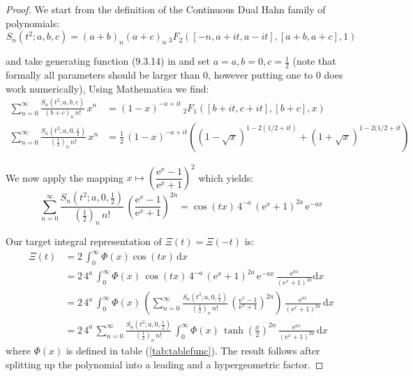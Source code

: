 \documentclass[a4paper,11pt,twoside]{amsart}
\newcommand{\verifiedeq}{=}
\newcommand{\defeq}{=}
\newcommand{\verifiedeq}{\stackrel{\checkmark}{=}}
\newcommand{\defeq}{\stackrel{\scriptscriptstyle \textnormal{def}}{=}}
\begin{document}
\begin{proof}
We start from the definition of the Continuous Dual Hahn family of polynomials:
\begin{equation}
 S_n(t^2;a,b,c) \defeq (a+b)_n(a+c)_n\, {}_3F_2([-n,a+it, a- it], [a+b, a+c], 1) 
\end{equation}

and take generating function (9.3.14) in \cite{koe} and set $a=a,b=0,c=\frac12$ (note that formally all parameters should be larger than $0$, however putting one to $0$ does work numerically), Using Mathematica we find:
\begin{align}
 \sum_{n=0}^\infty \frac{S_n(t^2;a,b,c)}{(b+c)_n\,n!}\, x^n &\verifiedeq (1-x)^{-a+it}\,{}_2F_1\left([b+it, c+it],[b+c], x\right) \\
\sum_{n=0}^\infty \frac{S_n\left(t^2;a,0,\frac12\right)}{\left(\frac12\right)_n\,n!}\,x^n&\verifiedeq \frac12\,(1-x)^{-a+it}\left((1-\sqrt{x})^{1-2(1/2+it)}+(1+\sqrt{x})^{1-2(1/2+it}\right)
\end{align}

We now apply the mapping $x \mapsto \left(\dfrac{\textrm{e}^{x}-1}{\textrm{e}^{x}+1}\right)^2$ which yields:
\begin{equation}
 \sum_{n=0}^\infty \frac{S_n\left(t^2;a,0,\frac12\right)}{\left(\frac12\right)_n\,n!}\, \left(\frac{\textrm{e}^{x}-1}{\textrm{e}^{x}+1}\right)^{2n} \verifiedeq \cos(tx)\,4^{-a}\,(\mathrm{e}^x+1)^{2a}\,\mathrm{e}^{-ax}
\end{equation}

Our target integral representation of $\Xi(t) = \Xi(-t)$ is:
\begin{align}
 \Xi(t) &\verifiedeq 2\,\int_{0}^\infty \Phi(x)\cos(tx)\, \mathrm{d}x \\
 &\verifiedeq 2\,4^a\,\int_{0}^\infty \Phi(x)\,\cos(tx)\,4^{-a}\,(\mathrm{e}^x+1)^{2a}\,\mathrm{e}^{-ax} \,\frac{\mathrm{e}^{ax}}{(\mathrm{e}^x+1)^{2a}} \mathrm{d}x \\
 &\verifiedeq 2\,4^a\,\int_{0}^\infty \Phi(x)\,\left(\sum_{n=0}^\infty \frac{S_n\left(t^2;a,0,\frac12\right)}{\left(\frac12\right)_n\,n!}\, \left(\frac{\textrm{e}^{x}-1}{\textrm{e}^{x}+1}\right)^{2n}\right)\,\frac{\mathrm{e}^{ax}}{(\mathrm{e}^x+1)^{2a}}\, \mathrm{d}x \\
 &\verifiedeq 2\,4^a\,\sum_{n=0}^\infty \frac{S_n\left(t^2;a,0,\frac12\right)}{\left(\frac12\right)_n\,n!}\,\int_{0}^{\infty} \Phi(x)\,\tanh\left(\frac{x}{2}\right)^{2n}\,\frac{\mathrm{e}^{ax}}{(\mathrm{e}^x+1)^{2a}}\,\mathrm{d}x \label{cdh0}
\end{align}
where $\Phi(x)$ is defined in table (\ref{tab:tablefunc}). The result follows after splitting up the polynomial into a leading and a hypergeometric factor.
\end{proof}
\end{document}
